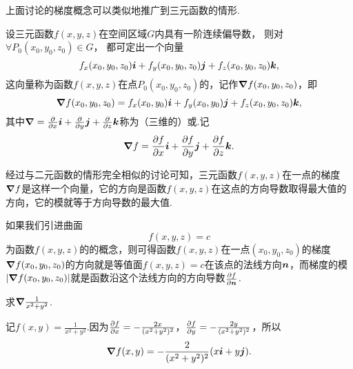 上面讨论的梯度概念可以类似地推广到三元函数的情形.
\begin{definition}
设三元函数\(f(x,y,z)\)在空间区域\(G\)内具有一阶连续偏导数，
则对\(\forall P_0(x_0,y_0,z_0) \in G\)，
都可定出一个向量\[
f_x(x_0,y_0,z_0) \boldsymbol{i} + f_y(x_0,y_0,z_0) \boldsymbol{j} + f_z(x_0,y_0,z_0) \boldsymbol{k},
\]这向量称为函数\(f(x,y,z)\)在点\(P_0(x_0,y_0,z_0)\)的，记作\(\grad f(x_0,y_0,z_0)\)，即\[
\grad f(x_0,y_0,z_0)
= f_x(x_0,y_0) \boldsymbol{i} + f_y(x_0,y_0) \boldsymbol{j} + f_z(x_0,y_0,z_0) \boldsymbol{k},
\]其中\(\grad = \pdv{x} \boldsymbol{i} + \pdv{y} \boldsymbol{j} + \pdv{z} \boldsymbol{k}\)称为（三维的）或.记\[
\grad f = \pdv{f}{x} \boldsymbol{i} + \pdv{f}{y} \boldsymbol{j} + \pdv{f}{z} \boldsymbol{k}.
\]
\end{definition}

经过与二元函数的情形完全相似的讨论可知，三元函数\(f(x,y,z)\)在一点的梯度\(\grad f\)是这样一个向量，它的方向是函数\(f(x,y,z)\)在这点的方向导数取得最大值的方向，它的模就等于方向导数的最大值.

如果我们引进曲面\[
f(x,y,z) = c
\]为函数\(f(x,y,z)\)的的概念，则可得函数\(f(x,y,z)\)在一点\((x_0,y_0,z_0)\)的梯度\(\grad f(x_0,y_0,z_0)\)的方向就是等值面\(f(x,y,z) = c\)在该点的法线方向\(\boldsymbol{n}\)，而梯度的模\(\abs{\grad f(x_0,y_0,z_0)}\)就是函数沿这个法线方向的方向导数\(\pdv{f}{\boldsymbol{n}}\).

\begin{example}
求\(\grad \frac{1}{x^2+y^2}\).
\begin{solution}
记\(f(x,y) = \frac{1}{x^2+y^2}\).因为\(\pdv{f}{x} = -\frac{2x}{(x^2+y^2)^2}\)，\(\pdv{f}{y} = -\frac{2y}{(x^2+y^2)^2}\)，所以\[
\grad f(x,y) = -\frac{2}{(x^2+y^2)^2} (x \boldsymbol{i} + y \boldsymbol{j}).
\]
\end{solution}
\end{example}

